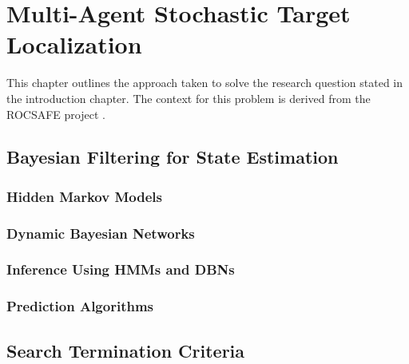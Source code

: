 \chapter{Multi-Agent Stochastic Target Localization}
\placeholder{}
This chapter outlines the approach taken to solve the research question stated in the introduction chapter. The context for this problem is derived from the ROCSAFE project \cite{rocsafeNUIG}. 

\section{Bayesian Filtering for State Estimation}

\subsection{Hidden Markov Models}

\label{Chapter:HMM}

\subsection{Dynamic Bayesian Networks}

\label{Chapter:DBN}

\subsection{Inference Using HMMs and DBNs}


\subsection{Prediction Algorithms}




\section{Search Termination Criteria}

